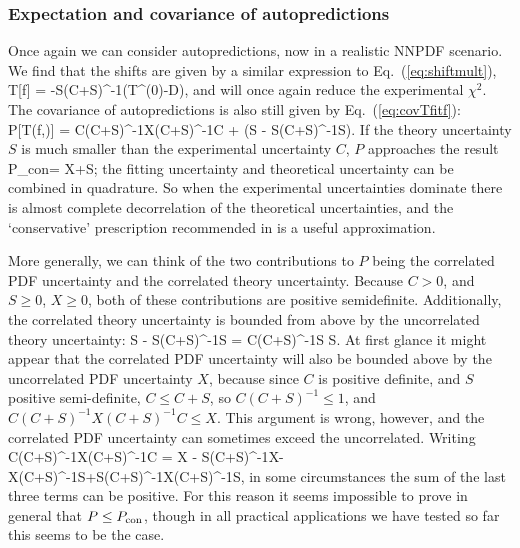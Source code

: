 \subsubsection{Expectation and covariance of autopredictions}
Once again we can consider autopredictions, now in a realistic NNPDF scenario. We find that the shifts are given by a similar expression to Eq.~(\ref{eq:shiftmult}), 
\be
\label{eq:shiftNN}
\delta T[f]  = -S(C+S)^{-1}(T^{(0)}-D),
\ee
and will once again reduce the experimental $\chi^2$.
The covariance of autopredictions is also still given by Eq.~(\ref{eq:covTfitf}):
\be
P\equiv{\Cov}[T(f,\lambda)] = C(C+S)^{-1}X(C+S)^{-1}C + (S - S(C+S)^{-1}S).\label{eq:PNN}
\ee
If the theory uncertainty $S$ is much smaller than the experimental uncertainty $C$, $P$ approaches the result
\be
P_{\rm con}= X+S;\label{eq:PconNN}
\ee
the fitting uncertainty and theoretical uncertainty can be combined in quadrature. So when the experimental uncertainties dominate there is almost complete decorrelation of the theoretical uncertainties, and the `conservative' prescription recommended in \cite{AbdulKhalek:2019ihb} is a useful approximation. 

More generally, we can think of the two contributions to $P$ being the correlated PDF uncertainty and the correlated theory uncertainty. Because $C >0$, and $S \geq 0$, $X \geq 0$, both of these contributions are positive semidefinite. Additionally, the correlated theory uncertainty is bounded from above by the uncorrelated theory uncertainty:
\leq S - S(C+S)^{-1}S = C(C+S)^{-1}S \leq S.\label{eq:Sbound}
\ee
At first glance it might appear that the correlated PDF uncertainty will also be bounded above by the uncorrelated PDF uncertainty $X$, because since $C$ is positive definite, and $S$ positive semi-definite, $C\leq C+S$, so $C(C+S)^{-1}\leq 1$, and $C(C+S)^{-1}X(C+S)^{-1}C \leq X$. This argument is wrong, however, and the correlated PDF uncertainty can sometimes exceed the uncorrelated. Writing
\be
C(C+S)^{-1}X(C+S)^{-1}C = X - S(C+S)^{-1}X- X(C+S)^{-1}S+S(C+S)^{-1}X(C+S)^{-1}S,
\label{eq:Xalgebra2}
\ee
in some circumstances the sum of the last three terms can be positive. For this reason it seems impossible to prove in general that $P\leq P_{\rm con}$, though in all practical applications we have tested so far this seems to be the case.

